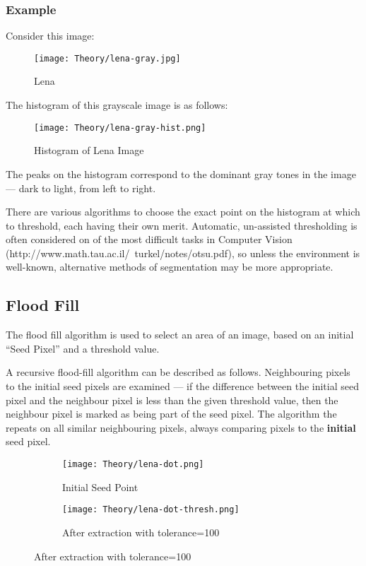 \subsubsection{Example}
Consider this image:

\begin{figure}
    \centering
    \texttt{[image: Theory/lena-gray.jpg]}
    \caption{Lena}
\end{figure}

The histogram of this grayscale image is as follows:

\begin{figure}
    \centering
    \texttt{[image: Theory/lena-gray-hist.png]}
    \caption{Histogram of Lena Image}
\end{figure}

The peaks on the histogram correspond to the dominant gray tones in the image --- dark to light, from left to right.

There are various algorithms to choose the exact point on the histogram at which to threshold, each having their own merit. Automatic, un-assisted thresholding is often considered on of the most difficult tasks in Computer Vision (http://www.math.tau.ac.il/~turkel/notes/otsu.pdf), so unless the environment is well-known, alternative methods of segmentation may be more appropriate.

\subsection{Flood Fill}
The flood fill algorithm is used to select an area of an image, based on an initial ``Seed Pixel'' and a threshold value.

A recursive flood-fill algorithm can be described as follows. Neighbouring pixels to the initial seed pixels are examined --- if the difference between the initial seed pixel and the neighbour pixel is less than the given threshold value, then the neighbour pixel is marked as being part of the seed pixel. The algorithm the repeats on all similar neighbouring pixels, always comparing pixels to the \textbf{initial} seed pixel.

\begin{figure}
    \centering
    \begin{subfigure}[b]{0.45\textwidth}
        \centering
        \texttt{[image: Theory/lena-dot.png]}
        \caption{Initial Seed Point}
    \end{subfigure}
    \begin{subfigure}[b]{0.45\textwidth}
        \centering
        \texttt{[image: Theory/lena-dot-thresh.png]}
        \caption{After extraction with tolerance=100}
    \end{subfigure}
\end{figure}

